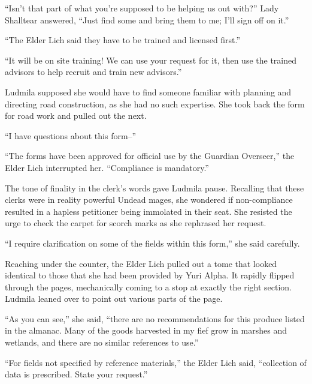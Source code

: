  

“Isn’t that part of what you’re supposed to be helping us out with?” Lady Shalltear answered, “Just find some and bring them to me; I’ll sign off on it.”

 

“The Elder Lich said they have to be trained and licensed first.”

 

“It will be on site training! We can use your request for it, then use the trained advisors to help recruit and train new advisors.”

 

Ludmila supposed she would have to find someone familiar with planning and directing road construction, as she had no such expertise. She took back the form for road work and pulled out the next.

 

“I have questions about this form–”

 

“The forms have been approved for official use by the Guardian Overseer,” the Elder Lich interrupted her. “Compliance is mandatory.”

 

The tone of finality in the clerk’s words gave Ludmila pause. Recalling that these clerks were in reality powerful Undead mages, she wondered if non-compliance resulted in a hapless petitioner being immolated in their seat. She resisted the urge to check the carpet for scorch marks as she rephrased her request.

 

“I require clarification on some of the fields within this form,” she said carefully.

 

Reaching under the counter, the Elder Lich pulled out a tome that looked identical to those that she had been provided by Yuri Alpha. It rapidly flipped through the pages, mechanically coming to a stop at exactly the right section. Ludmila leaned over to point out various parts of the page.

 

“As you can see,” she said, “there are no recommendations for this produce listed in the almanac. Many of the goods harvested in my fief grow in marshes and wetlands, and there are no similar references to use.”

 

“For fields not specified by reference materials,” the Elder Lich said, “collection of data is prescribed. State your request.”

